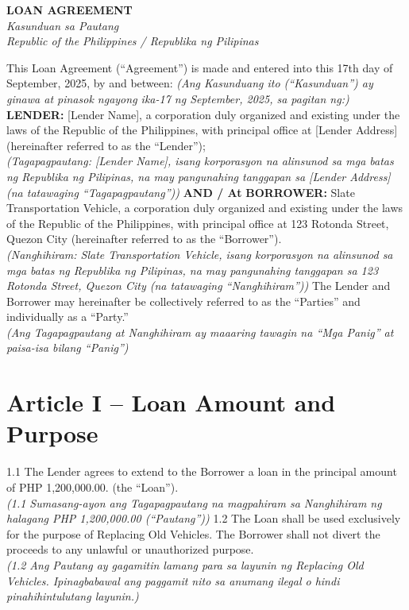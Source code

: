 \documentclass[a4paper,12pt]{article}
\begin{document}
\begin{center}
{\large \textbf{LOAN AGREEMENT}} \\
\textit{Kasunduan sa Pautang} \\
\textit{Republic of the Philippines / Republika ng Pilipinas}
\end{center}
\vspace{0.5cm}
This Loan Agreement (``Agreement'') is made and entered into this 17th day of September, 2025, by and between:
\textit{(Ang Kasunduang ito (``Kasunduan'') ay ginawa at pinasok ngayong ika-17 ng September, 2025, sa pagitan ng:)}
\vspace{0.5cm}
\textbf{LENDER:} [Lender Name], a corporation duly organized and existing under the laws of the Republic of the Philippines, with principal office at [Lender Address] (hereinafter referred to as the ``Lender''); \\
\textit{(Tagapagpautang: [Lender Name], isang korporasyon na alinsunod sa mga batas ng Republika ng Pilipinas, na may pangunahing tanggapan sa [Lender Address] (na tatawaging ``Tagapagpautang''))}
\vspace{0.3cm}
\textbf{AND / At}
\vspace{0.3cm}
\textbf{BORROWER:} Slate Transportation Vehicle, a corporation duly organized and existing under the laws of the Republic of the Philippines, with principal office at 123 Rotonda Street, Quezon City (hereinafter referred to as the ``Borrower''). \\
\textit{(Nanghihiram: Slate Transportation Vehicle, isang korporasyon na alinsunod sa mga batas ng Republika ng Pilipinas, na may pangunahing tanggapan sa 123 Rotonda Street, Quezon City (na tatawaging ``Nanghihiram''))}
\vspace{0.5cm}
The Lender and Borrower may hereinafter be collectively referred to as the ``Parties'' and individually as a ``Party.'' \\
\textit{(Ang Tagapagpautang at Nanghihiram ay maaaring tawagin na ``Mga Panig'' at paisa-isa bilang ``Panig'')}
\section*{Article I – Loan Amount and Purpose}
1.1 The Lender agrees to extend to the Borrower a loan in the principal amount of PHP 1,200,000.00. (the ``Loan''). \\
\textit{(1.1 Sumasang-ayon ang Tagapagpautang na magpahiram sa Nanghihiram ng halagang PHP 1,200,000.00 (``Pautang''))}
1.2 The Loan shall be used exclusively for the purpose of Replacing Old Vehicles. The Borrower shall not divert the proceeds to any unlawful or unauthorized purpose. \\
\textit{(1.2 Ang Pautang ay gagamitin lamang para sa layunin ng Replacing Old Vehicles. Ipinagbabawal ang paggamit nito sa anumang ilegal o hindi pinahihintulutang layunin.)}
\end{document}
